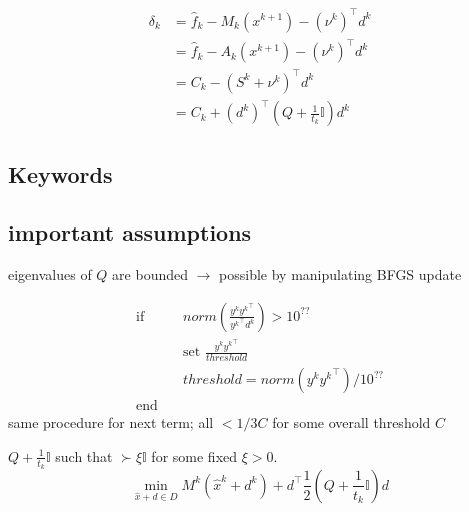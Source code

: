 \begin{align}
	\delta_k  &= \hat{f}_k - M_k(x^{k+1}) - (\nu^k)^{\top}d^k\\
	&= \hat{f}_k - A_k(x^{k+1}) - (\nu^k)^{\top}d^k\\
	&= C_k - (S^k+\nu^k)^{\top}d^k \\
	&= C_k + (d^k)^{\top}\left(Q+\frac{1}{t_k}\mathbb{I}\right)d^k
	\label{Noll_delta}
\end{align}







\subsection{Keywords}






\subsection{important assumptions}
eigenvalues of \(Q\) are bounded \(\to\) possible by manipulating BFGS update

\begin{align}
	\text{if} &\quad norm\left(\frac{y^k{y^k}^{\top}}{{y^k}^{\top}d^k}\right) > 10^{??} \\
	&\quad \text{set } \frac{y^k{y^k}^{\top}}{threshold} \\
	&\quad threshold = norm\left(y^k{y^k}^{\top}\right)/10^{??} \\
	\text{end} &
\end{align}
same procedure for next term; all \(<1/3C\) for some overall threshold \(C\) 

\(Q+\frac{1}{t_k}\mathbb{I}\) such that \(\succ \xi \mathbb{I}\) for some fixed \(\xi > 0\). \\

\begin{equation}
	\min_{\hat{x}+d \in D} M^k(\hat{x}^k+d^k)+d^{\top}\frac{1}{2}\left(Q+\frac{1}{t_k}\mathbb{I}\right)d	
\label{Q_subprob}
\end{equation}
 

